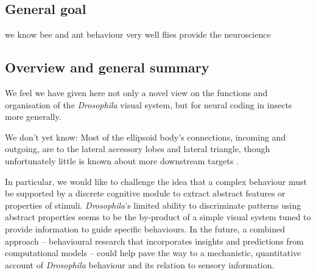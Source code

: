 \subsection{General goal}

we know bee and ant behaviour very well flies provide the neuroscience

\subsection{Overview and general summary}


We feel we have given here not only a novel view on the functions and organisation of the \emph{Drosophila} visual system, but for neural coding in insects more generally.

We don't yet know:
Most of the ellipsoid body's connections, incoming and outgoing, are to the lateral accessory lobes and lateral triangle, though unfortunately little is known about more downstream targets \cite{Pfeiffer2014,Young2010}.

In particular, we would like to challenge the idea that a complex behaviour must be supported by a discrete cognitive module to extract abstract features or properties of stimuli.
\emph{Drosophila}'s limited ability to discriminate patterns using abstract properties seems to be the by-product of a simple visual system tuned to provide information to guide specific behaviours.
In the future, a combined approach -- behavioural research that incorporates insights and predictions from computational models -- could help pave the way to a mechanistic, quantitative account of \emph{Drosophila} behaviour and its relation to sensory information.

